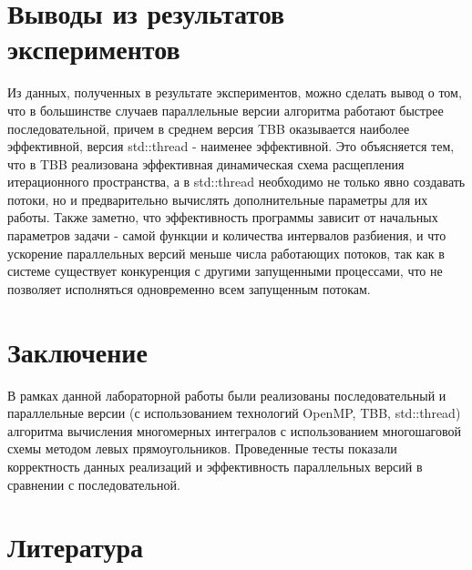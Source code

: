 \documentclass{report}
\begin{document}
\section*{Выводы из результатов экспериментов}

\par Из данных, полученных в результате экспериментов, можно сделать вывод о том, что в большинстве случаев параллельные версии алгоритма работают быстрее последовательной, причем в среднем версия TBB оказывается наиболее эффективной, версия std::thread - наименее эффективной. Это объясняется тем, что в TBB реализована эффективная динамическая схема расщепления итерационного пространства, а в std::thread необходимо не только явно создавать потоки, но и предварительно вычислять дополнительные параметры для их работы. Также заметно, что эффективность программы зависит от начальных параметров задачи - самой функции и количества интервалов разбиения, и что ускорение параллельных версий меньше числа работающих потоков, так как в системе существует конкуренция с другими запущенными процессами, что не позволяет исполняться одновременно всем запущенным потокам.

\clearpage

\section*{Заключение}

\par В рамках данной лабораторной работы были реализованы последовательный и параллельные версии (с использованием технологий OpenMP, TBB, std::thread) алгоритма вычисления многомерных интегралов с использованием многошаговой схемы методом левых прямоугольников. Проведенные тесты показали корректность данных реализаций и эффективность параллельных версий в сравнении с последовательной.

\clearpage

\section*{Литература}
\end{document}
